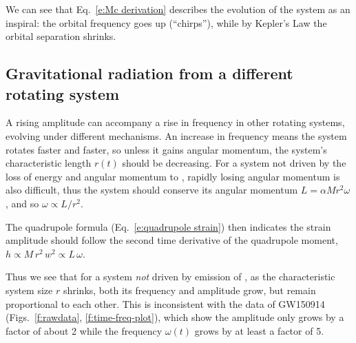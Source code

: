 \documentclass{andp2012}%
\def\w{\omega}
\newcommand{\refigures}[1]{Figs.~\ref{#1}}
\newcommand{\refeqn}[1]{Eq.\ \ref{#1}}
\begin{document}
We can see that \refeqn{e:Mc derivation}
describes the evolution of the system as an inspiral:
the orbital frequency goes up (``chirps''),
while by Kepler's Law the orbital separation shrinks.

\subsection{Gravitational radiation from a different rotating system}
\label{app:different inspiral}
A rising \GW amplitude can accompany a rise in frequency
in other rotating systems,
evolving under different mechanisms.
An increase in frequency means the system rotates faster and faster,
so unless it gains angular momentum, 
the system's characteristic length $r(t)$ should be decreasing.
For a system not driven by the loss of
energy and angular momentum to \GWsns,
rapidly losing angular momentum is also difficult,
thus the system should conserve its angular momentum
$L=\alpha M r^2 \w$,
and so $\w \propto L/r^2$.

The quadrupole formula (\refeqn{e:quadrupole strain})
then indicates the \GW strain amplitude should follow
the second time derivative of the quadrupole moment,
$h \propto M\, r^2 \, w^2 \propto L\,\w$.

Thus we see that for a system
\emph{not} driven by emission of \GWsns,
as the characteristic system size $r$ shrinks,
both its \GW frequency and amplitude grow,
but remain proportional to each other.
This is inconsistent with the data of GW150914
(\refigures{f:rawdata}, \ref{f:time-freq-plot}),
which show the amplitude only grows by a factor of about 2
while the frequency $\w(t)$ grows by at least a factor of 5.
\end{document}

